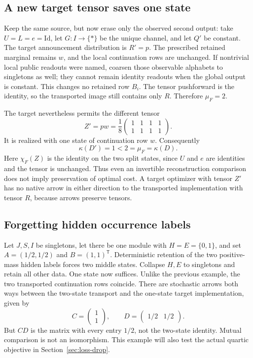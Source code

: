 \documentclass[11pt]{article}
\newcommand{\Id}{\mathrm{Id}}
\theoremstyle{remark}
\begin{document}
\subsection{A new target tensor saves one state}\label{sec:new-tensor}
Keep the same source, but now erase only the observed second output: take $U=L=e=\Id$, let $G:I\to\{*\}$ be the unique channel, and let $Q'$ be constant. The target announcement distribution is $R'=p$. The prescribed retained marginal remains $w$, and the local continuation rows are unchanged. If nontrivial local public readouts were named, coarsen those observable alphabets to singletons as well; they cannot remain identity readouts when the global output is constant. This changes no retained row $B_i$. The tensor pushforward is the identity, so the transported image still contains only $R$. Therefore $\mu_F=2$.

The target nevertheless permits the different tensor
\[
 Z'=p w=\frac18\begin{pmatrix}1&1&1&1\\1&1&1&1\end{pmatrix}.
\]
It is realized with one state of continuation row $w$. Consequently
\[
 \kappa(D')=1<2=\mu_F=\kappa(D).
\]
Here $\chi_F(Z)$ is the identity on the two split states, since $U$ and $e$ are identities and the tensor is unchanged. Thus even an invertible reconstruction comparison does not imply preservation of optimal cost. A target optimizer with tensor $Z'$ has no native arrow in either direction to the transported implementation with tensor $R$, because arrows preserve tensors.

\subsection{Forgetting hidden occurrence labels}
Let $J,S,I$ be singletons, let there be one module with $H=E=\{0,1\}$, and set $A=(1/2,1/2)$ and $B=(1,1)^{\mathsf T}$. Deterministic retention of the two positive-mass hidden labels forces two middle states. Collapse $H,E$ to singletons and retain all other data. One state now suffices. Unlike the previous example, the two transported continuation rows coincide. There are stochastic arrows both ways between the two-state transport and the one-state target implementation, given by
\[
 C=\begin{pmatrix}1\\1\end{pmatrix},\qquad
 D=\begin{pmatrix}1/2&1/2\end{pmatrix}.
\]
But $CD$ is the matrix with every entry $1/2$, not the two-state identity. Mutual comparison is not an isomorphism. This example will also test the actual quartic objective in Section~\ref{sec:loss-drop}.
\end{document}
